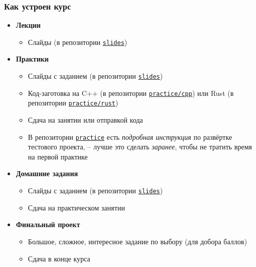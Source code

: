 \documentclass[10pt]{beamer}
\begin{document}
\begin{frame}
\frametitle{Как устроен курс}
\begin{itemize}
\item \textbf{Лекции}
\begin{itemize}
\item Слайды (в репозитории \href{https://github.com/lisyarus/realtime-graphics-course-v2-slides/tree/main/pdf}{\nolinkurl{slides}})
\end{itemize}
\pause
\item \textbf{Практики}
\pause
\begin{itemize}
\item Слайды с заданием (в репозитории \href{https://github.com/lisyarus/realtime-graphics-course-v2-slides/tree/main/pdf}{\nolinkurl{slides}})
\pause
\item Код-заготовка на C++ (в репозитории \href{https://github.com/lisyarus/realtime-graphics-course-v2-practice/tree/main/cpp}{\nolinkurl{practice/cpp}}) или Rust (в репозитории \href{https://github.com/lisyarus/realtime-graphics-course-v2-practice/tree/main/rust}{\nolinkurl{practice/rust}})
\pause
\item Сдача на занятии или отправкой кода
\pause
\item В репозитории \href{https://github.com/lisyarus/realtime-graphics-course-v2-practice}{\nolinkurl{practice}} есть \textit{подробная инструкция} по развёртке тестового проекта, -- лучше это сделать \textit{заранее}, чтобы не тратить время на первой практике
\end{itemize}
\pause
\item \textbf{Домашние задания}
\pause
\begin{itemize}
\item Слайды с заданием (в репозитории \href{https://github.com/lisyarus/realtime-graphics-course-v2-slides/tree/master/pdf}{\nolinkurl{slides}})
\pause
\item Сдача на практическом занятии
\end{itemize}
\pause
\item \textbf{Финальный проект}
\begin{itemize}
\item Большое, сложное, интересное задание по выбору (для добора баллов)
\pause
\item Сдача в конце курса
\end{itemize}
\end{itemize}
\end{frame}
\end{document}
